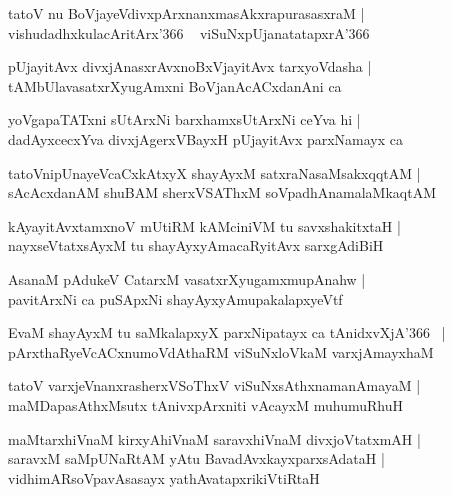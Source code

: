 \documentclass[twoside,12pt,openright]{book}
\newcounter{shloka}[chapter]
\begin{document}
\begin{shloka}%
tatoV nu BoVjayeVdivxpArxnanxmasAkxrapurasasxraM |\\
vishudadhxkulacAritArx\char'366 ~ viSuNxpUjanatatapxrA\char'366
\end{shloka}

\begin{shloka}%
pUjayitAvx divxjAnasxrAvxnoBxVjayitAvx tarxyoVdasha |\\
tAMbUlavasatxrXyugAmxni BoVjanAcACxdanAni ca 
\end{shloka}

\begin{shloka}%
yoVgapaTATxni sUtArxNi barxhamxsUtArxNi ceYva hi |\\
dadAyxcecxYva divxjAgerxVBayxH pUjayitAvx parxNamayx ca 
\end{shloka}

\begin{shloka}%
tatoVnipUnayeVcaCxkAtxyX shayAyxM satxraNasaMsakxqqtAM |\\
sAcAcxdanAM shuBAM sherxVSAThxM soVpadhAnamalaMkaqtAM 
\end{shloka}

\begin{shloka}%
kAyayitAvxtamxnoV mUtiRM kAMciniVM tu savxshakitxtaH |\\
nayxseVtatxsAyxM tu shayAyxyAmacaRyitAvx sarxgAdiBiH 
\end{shloka}

\begin{shloka}%
AsanaM pAdukeV CatarxM vasatxrXyugamxmupAnahw |\\
pavitArxNi ca puSApxNi shayAyxyAmupakalapxyeVtf
\end{shloka}

\begin{shloka}%
EvaM shayAyxM tu saMkalapxyX parxNipatayx ca tAnidxvXjA\char'366 ~|\\
pArxthaRyeVcACxnumoVdAthaRM viSuNxloVkaM varxjAmayxhaM 
\end{shloka}

\begin{shloka}%
tatoV varxjeVnanxrasherxVSoThxV viSuNxsAthxnamanAmayaM |\\
maMDapasAthxMsutx tAnivxpArxniti vAcayxM muhumuRhuH
\end{shloka}

\begin{shloka}%
maMtarxhiVnaM kirxyAhiVnaM saravxhiVnaM divxjoVtatxmAH |\\
saravxM saMpUNaRtAM yAtu BavadAvxkayxparxsAdataH |\\
vidhimARsoVpavAsasayx yathAvatapxrikiVtiRtaH 
\end{shloka}
\end{document}
